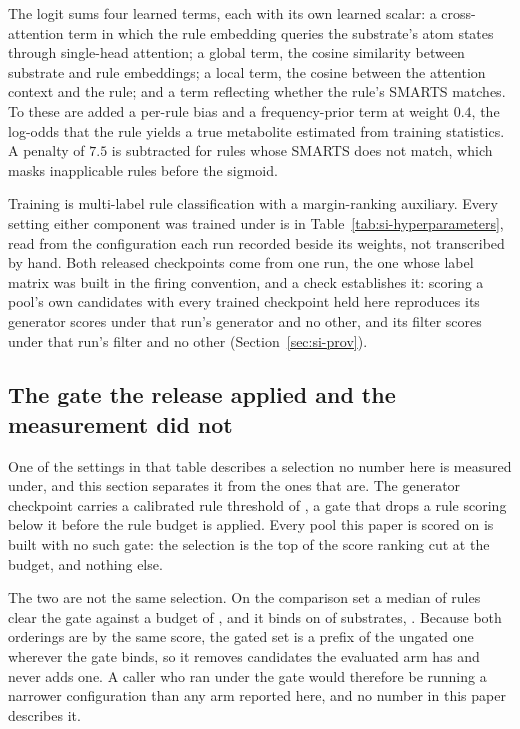 \documentclass[journal=jcisd8,manuscript=suppinfo,layout=onecolumn]{achemso}
\begin{document}
The logit sums four learned terms, each with its own learned scalar: a cross-attention term in
which the rule embedding queries the substrate's atom states through single-head attention; a
global term, the cosine similarity between substrate and rule embeddings; a local term, the cosine
between the attention context and the rule; and a term reflecting whether the rule's SMARTS
matches. To these are added a per-rule bias and a frequency-prior term at weight $0.4$, the
log-odds that the rule yields a true metabolite estimated from training statistics. A penalty of
$7.5$ is subtracted for rules whose SMARTS does not match, which masks inapplicable rules before
the sigmoid.

Training is multi-label rule classification with a margin-ranking auxiliary. Every setting either
component was trained under is in Table~\ref{tab:si-hyperparameters}, read from the configuration
each run recorded beside its weights, not transcribed by hand. Both released checkpoints come from
one run, the one whose label matrix was built in the firing convention, and a check establishes it:
scoring a pool's own candidates with every trained checkpoint held here
reproduces its generator scores under that run's generator and no other, and its filter scores
under that run's filter and no other (Section~\ref{sec:si-prov}).



\subsection{The gate the release applied and the measurement did not}

One of the settings in that table describes a selection no number here is measured under, and this
section separates it from the ones that are. The generator checkpoint carries a calibrated rule
threshold of \numDefaultgateThreshold{}, a gate that drops a rule scoring below it before the
rule budget is applied. Every pool this paper is scored on is built with no such gate: the
selection is the top of the score ranking cut at the budget, and nothing else.

The two are not the same selection. On the comparison set a median of \numDefaultgateClearing{}
rules clear the gate against a budget of \numDefaultgateBudget{}, and it binds on
\numDefaultgateBinds{} of \numPopulationN{} substrates, \numDefaultgateBindsharePct{}. Because
both orderings are by the same score, the gated set is a prefix of the ungated one wherever the
gate binds, so it removes candidates the evaluated arm has and never adds one. A caller who ran
under the gate would therefore be running a narrower configuration than any arm reported here,
and no number in this paper describes it.
\end{document}
